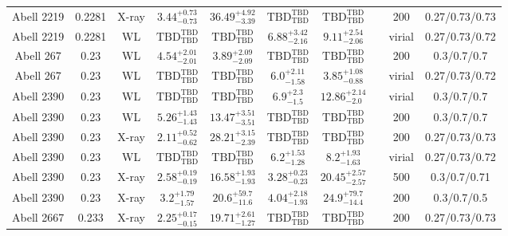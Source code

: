 \begin{table}
\begin{tabular}{cccccccccc}
Abell 2219 & 0.2281 & X-ray & ${3.44}^{+0.73}_{-0.73}$ & ${36.49}^{+4.92}_{-3.39}$ & ${\mathrm{TBD}}^{\mathrm{TBD}}_{\mathrm{TBD}}$ & ${\mathrm{TBD}}^{\mathrm{TBD}}_{\mathrm{TBD}}$ & \citet{BA14.1} & 200 & 0.27/0.73/0.73 \\
Abell 2219 & 0.2281 & WL & ${\mathrm{TBD}}^{\mathrm{TBD}}_{\mathrm{TBD}}$ & ${\mathrm{TBD}}^{\mathrm{TBD}}_{\mathrm{TBD}}$ & ${6.88}^{+3.42}_{-2.16}$ & ${9.11}^{+2.54}_{-2.06}$ & \citet{OK10.1} & virial & 0.27/0.73/0.72 \\
Abell 267 & 0.23 & WL & ${4.54}^{+2.01}_{-2.01}$ & ${3.89}^{+2.09}_{-2.09}$ & ${\mathrm{TBD}}^{\mathrm{TBD}}_{\mathrm{TBD}}$ & ${\mathrm{TBD}}^{\mathrm{TBD}}_{\mathrm{TBD}}$ & \citet{BA07.1} & 200 & 0.3/0.7/0.7 \\
Abell 267 & 0.23 & WL & ${\mathrm{TBD}}^{\mathrm{TBD}}_{\mathrm{TBD}}$ & ${\mathrm{TBD}}^{\mathrm{TBD}}_{\mathrm{TBD}}$ & ${6.0}^{+2.11}_{-1.58}$ & ${3.85}^{+1.08}_{-0.88}$ & \citet{OK10.1} & virial & 0.27/0.73/0.72 \\
Abell 2390 & 0.23 & WL & ${\mathrm{TBD}}^{\mathrm{TBD}}_{\mathrm{TBD}}$ & ${\mathrm{TBD}}^{\mathrm{TBD}}_{\mathrm{TBD}}$ & ${6.9}^{+2.3}_{-1.5}$ & ${12.86}^{+2.14}_{-2.0}$ & \citet{UM09.1} & virial & 0.3/0.7/0.7 \\
Abell 2390 & 0.23 & WL & ${5.26}^{+1.43}_{-1.43}$ & ${13.47}^{+3.51}_{-3.51}$ & ${\mathrm{TBD}}^{\mathrm{TBD}}_{\mathrm{TBD}}$ & ${\mathrm{TBD}}^{\mathrm{TBD}}_{\mathrm{TBD}}$ & \citet{BA07.1} & 200 & 0.3/0.7/0.7 \\
Abell 2390 & 0.23 & X-ray & ${2.11}^{+0.52}_{-0.62}$ & ${28.21}^{+3.15}_{-2.39}$ & ${\mathrm{TBD}}^{\mathrm{TBD}}_{\mathrm{TBD}}$ & ${\mathrm{TBD}}^{\mathrm{TBD}}_{\mathrm{TBD}}$ & \citet{BA14.1} & 200 & 0.27/0.73/0.73 \\
Abell 2390 & 0.23 & WL & ${\mathrm{TBD}}^{\mathrm{TBD}}_{\mathrm{TBD}}$ & ${\mathrm{TBD}}^{\mathrm{TBD}}_{\mathrm{TBD}}$ & ${6.2}^{+1.53}_{-1.28}$ & ${8.2}^{+1.93}_{-1.63}$ & \citet{OK10.1} & virial & 0.27/0.73/0.72 \\
Abell 2390 & 0.23 & X-ray & ${2.58}^{+0.19}_{-0.19}$ & ${16.58}^{+1.93}_{-1.93}$ & ${3.28}^{+0.23}_{-0.23}$ & ${20.45}^{+2.57}_{-2.57}$ & \citet{VI05.1} & 500 & 0.3/0.7/0.71 \\
Abell 2390 & 0.23 & X-ray & ${3.2}^{+1.79}_{-1.57}$ & ${20.6}^{+59.7}_{-11.6}$ & ${4.04}^{+2.18}_{-1.93}$ & ${24.9}^{+79.7}_{-14.4}$ & \citet{AL03.1} & 200 & 0.3/0.7/0.5 \\
Abell 2667 & 0.233 & X-ray & ${2.25}^{+0.17}_{-0.15}$ & ${19.71}^{+2.61}_{-1.27}$ & ${\mathrm{TBD}}^{\mathrm{TBD}}_{\mathrm{TBD}}$ & ${\mathrm{TBD}}^{\mathrm{TBD}}_{\mathrm{TBD}}$ & \citet{BA14.1} & 200 & 0.27/0.73/0.73 \\

\end{tabular}
\end{table}
